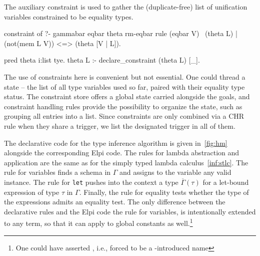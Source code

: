 \documentclass[a4paper, 11pt]{book}
\begin{document}
\noindent
The auxiliary constraint  is used to gather the (duplicate-free)
list of unification variables constrained to be equality types.

\begin{elpicode}
constraint of ?- gammabar eqbar theta rm-eqbar {
  rule (eqbar V) \ (theta L) | (not(mem L V)) <=> (theta [V | L]).
}

pred theta i:list tye.
theta L :- declare_constraint (theta L) [_].
\end{elpicode}

The use of constraints here is convenient but not essential. One could thread
a state -- the list of all type variables used so far, paired with their
equality type status. The constraint store offers a global state carried
alongside the goals, and constraint handling rules provide the possibility to
organize the state, such as grouping all entries into a list. Since
constraints are only combined via a CHR rule when they share a trigger,
we list the designated trigger \elpi{_} in all of them.

The declarative code for the type inference algorithm is given
in~\cref{fig:hm} alongside the corresponding Elpi code.
 The
rules for lambda abstraction and application are the same as for the simply
typed lambda calculus~\cref{inf:stlc}. The rule for variables finds a schema
in $\Gamma$ and assigns to the variable any valid instance. The rule for
\texttt{let} pushes into the context a type $\overline{\Gamma}(\tau)$ for a
let-bound expression of type $\tau$ in $\Gamma$. Finally, the rule for
equality tests whether the type of the expressions admits an equality test.
The only difference between the declarative rules and the Elpi code
the rule for variables,
is intentionally extended to any term, so that it can apply to global
constants as well.\footnote{One could have asserted , i.e.,
forced  to be a -introduced name}
\end{document}
